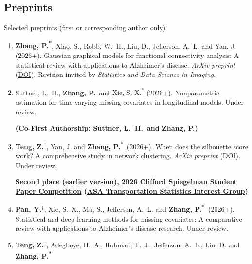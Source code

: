 \documentclass[12pt,letterpaper]{article}
\newcommand{\PZ}{\textbf{Zhang, P.\textsuperscript{*}}}
\newcommand{\PZnot}{\textbf{Zhang, P.}}
\newcommand{\DOI}[1]{\href{https://doi.org/#1}{DOI}}
\newcommand{\pubnote}[1]{%
  \par\nobreak\addvspace{4pt}\nobreak%
  {\normalsize\bfseries\color{purple}%
   \hypersetup{urlcolor=cvnoteblue}#1\par}%
  \nobreak\addvspace{5pt}%
}
\newenvironment{cventry}{\begin{minipage}[t]{\linewidth}}{\end{minipage}}
\begin{document}
	\subsection*{Preprints}
	\noindent\small
	\underline{Selected preprints (first or corresponding author 
	only)}
	\normalsize
	
	\begin{enumerate}		
		\item\begin{cventry} \PZ, {Xiao, S., Robb, W.\ H., Liu, D., 
		Jefferson, A.\ L.} and Yan, J. (2026+). Gaussian graphical 
		models for 
		functional connectivity analysis: A statistical review with 
		applications to Alzheimer's disease. {\em ArXiv preprint} 
		(\DOI{10.48550/arXiv.2604.10249}). Revision invited by {\em 
		Statistics and Data Science in Imaging}.
		\par\end{cventry}
		\item\begin{cventry} {Suttner, L.\ H.,} \PZnot\ and {Xie, S. 
		X.\textsuperscript{*}} 
		(2026+). Nonparametric estimation for time-varying missing 
		covariates in longitudinal models. Under review. 
		\pubnote{(Co-First 
		Authorship: Suttner, L.\ H.\ and \PZnot)}
		\par\end{cventry}
		\item\begin{cventry} {\textbf{Teng, Z.$^\dagger$}, 
		Yan, 
		J.} and \PZ\ 
		(2026+). When does the silhouette score work? A comprehensive
		study in network clustering. {\em ArXiv preprint} 
		(\DOI{10.48550/arXiv.2512.24841}). Under review.
		\pubnote{Second place (earlier version), 2026 
			\href{https://community.amstat.org/tsig/events/papercompetition}{Clifford
			 Spiegelman Student Paper Competition} 
			(\href{https://community.amstat.org/tsig/home}{ASA 
			Transportation Statistics Interest Group})}
		\par\end{cventry}
		\item\begin{cventry} {\textbf{Pan, Y.$^\dagger$}, Xie, S.\ 
		X., Ma, S., 
		Jefferson, A.\ L.} and \PZ\ (2026+). Statistical and deep 
		learning methods for missing	covariates: A comparative review 
		with applications to Alzheimer's disease research. Under 
		review.
		\par\end{cventry}
		\item\begin{cventry} {\textbf{Teng, Z.$^\dagger$}, Adegboye, 
		H.\ 
		A., Hohman, T.\ J., Jefferson, A.\ L., Liu, D.} and \PZ\ 

\end{cventry}
\end{enumerate}
\end{document}
